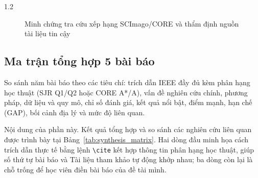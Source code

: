 \begin{spacing}{1.2}
\begin{figure}[htpb]
\centering
{}
\caption{Minh chứng tra cứu xếp hạng SCImago/CORE và thẩm định nguồn tài liệu tin cậy}
\label{fig:minh_chung_xep_hang}
\end{figure}

\subsection{Ma trận tổng hợp 5 bài báo}
\label{subsec:ma_tran}

\begin{huongdan}
So sánh năm bài báo theo các tiêu chí: trích dẫn IEEE đầy đủ kèm phân hạng học thuật (SJR Q1/Q2 hoặc CORE A*/A), vấn đề nghiên cứu chính, phương pháp, dữ liệu và quy mô, chỉ số đánh giá, kết quả nổi bật, điểm mạnh, hạn chế (GAP), bối cảnh địa lý và mức độ liên quan.
\end{huongdan}

Nội dung của phần này. Kết quả tổng hợp và so sánh các nghiên cứu liên quan được trình bày tại Bảng~\ref{tab:synthesis_matrix}. Hai dòng đầu minh họa cách trích dẫn thực tế bằng lệnh \texttt{\textbackslash cite} kết hợp thông tin phân hạng học thuật, giúp số thứ tự bài báo và Tài liệu tham khảo tự động khớp nhau; ba dòng còn lại là chỗ trống để học viên điền bài báo của đề tài mình.


\end{spacing}
